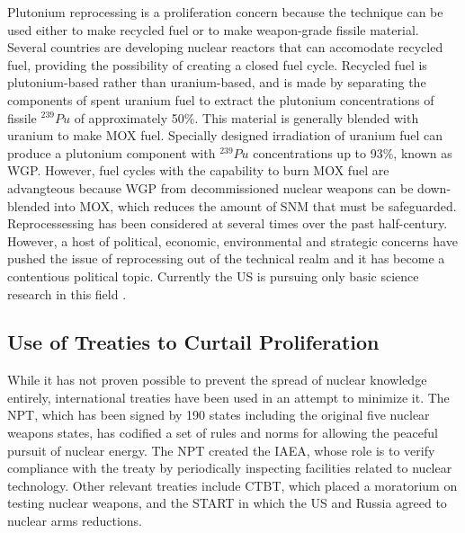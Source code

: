Plutonium reprocessing is a proliferation concern because the technique can be used either to make recycled fuel or to make weapon-grade fissile material.  Several countries are developing nuclear reactors that can accomodate recycled fuel, providing the possibility of creating a closed fuel cycle\cite{_processing_2015}.  Recycled fuel is plutonium-based rather than uranium-based, and is made by separating the components of spent uranium fuel to extract the plutonium concentrations of fissile $^{239}Pu$ of approximately 50\%.  This material is generally  blended with uranium to make \gls{MOX} fuel.  Specially designed irradiation of uranium fuel can produce a plutonium component with $^{239}Pu$ concentrations up to 93\%, known as \gls{WGP}. However, fuel cycles with the capability to burn \gls{MOX} fuel are advangteous because \gls{WGP} from decommissioned nuclear weapons can be down-blended into \gls{MOX}, which reduces the amount of \gls{SNM} that must be safeguarded.  Reprocessessing has been considered at several times over the past half-century.  However, a host of political, economic, environmental and strategic concerns have pushed the issue of reprocessing out of the technical realm and it has become a contentious political topic\cite{rossin_policy_????}.  Currently the \gls{US} is pursuing only basic science research in this field \cite{editorial_adieu_2009}.

\subsection{Use of Treaties to Curtail Proliferation}

While it has not proven possible to prevent the spread of nuclear knowledge entirely, international treaties have been used in an attempt to minimize it.  The \gls{NPT}, which has been signed by 190 states including the original five nuclear weapons states, has codified a set of rules and norms for allowing the peaceful pursuit of nuclear energy\cite{_treaty_????}.  The \gls{NPT} created the \gls{IAEA}, whose role is to verify compliance with the treaty by periodically inspecting facilities related to nuclear technology.  Other relevant treaties include \gls{CTBT}, which placed a moratorium on testing nuclear weapons, and the \gls{START} in which the \gls{US} and Russia agreed to nuclear arms reductions.

